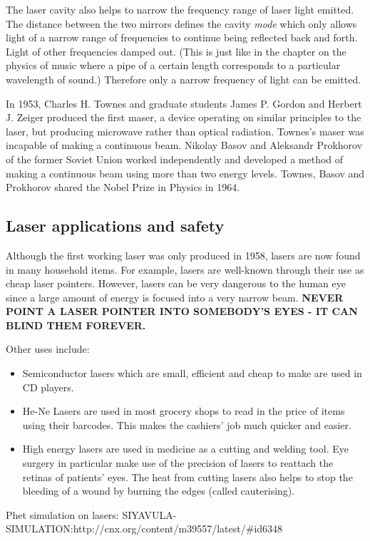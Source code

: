 The laser cavity also helps to narrow the frequency range of laser light emitted. The distance between the two mirrors defines the cavity \textit{mode} which only allows light of a narrow range of frequencies to continue being reflected back and forth. Light of other frequencies damped out. (This is just like in the chapter on the physics of music where a pipe of a certain length corresponds to a particular wavelength of sound.) Therefore only a narrow frequency of light can be emitted.


\begin{IFact}
{In 1953, Charles H. Townes and graduate students James P. Gordon and Herbert J. Zeiger produced the first maser, a device operating on similar principles to the laser, but producing microwave rather than optical radiation. Townes's maser was incapable of making a continuous beam. Nikolay Basov and Aleksandr Prokhorov of the former Soviet Union worked independently and developed a method of making a continuous beam using more than two energy levels. Townes, Basov and Prokhorov shared the Nobel Prize in Physics in 1964.}
\end{IFact}


\subsection{Laser applications and safety}
Although the first working laser was only produced in 1958, lasers are now found in many household items. For example, lasers are well-known through their use as cheap laser pointers. However, lasers can be very dangerous to the human eye since a large amount of energy is focused into a very narrow beam. \textbf{NEVER POINT A LASER POINTER INTO SOMEBODY'S EYES - IT CAN BLIND THEM FOREVER.}

Other uses include:
\begin{itemize}
\item Semiconductor lasers which are small, efficient and cheap to make are used in CD players. 
\item He-Ne Lasers are used in most grocery shops to read in the price of items using their barcodes. This makes the cashiers' job much quicker and easier.
\item High energy lasers are used in medicine as a cutting and welding tool. Eye surgery in particular make use of the precision of lasers to reattach the retinas of patients' eyes. The heat from cutting lasers also helps to stop the bleeding of a wound by burning the edges (called cauterising).
\end{itemize}
Phet simulation on lasers: SIYAVULA-SIMULATION:http://cnx.org/content/m39557/latest/#id6348

